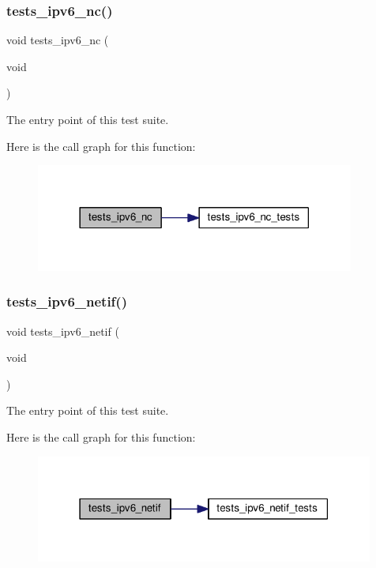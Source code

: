 \subsubsection{\texorpdfstring{tests\+\_\+ipv6\+\_\+nc()}{tests\_ipv6\_nc()}}
{\footnotesize\ttfamily void tests\+\_\+ipv6\+\_\+nc (\begin{DoxyParamCaption}\item[{void}]{ }\end{DoxyParamCaption})}



The entry point of this test suite. 

Here is the call graph for this function\+:
\nopagebreak
\begin{figure}[H]
\begin{center}
\leavevmode
\includegraphics[width=297pt]{group__unittests_ga011adecd50fb31c2e9fb4b402259fab3_cgraph}
\end{center}
\end{figure}
\mbox{\label{group__unittests_gaee22d83f1a9d3716168640ccd429c918}} 
\subsubsection{\texorpdfstring{tests\+\_\+ipv6\+\_\+netif()}{tests\_ipv6\_netif()}}
{\footnotesize\ttfamily void tests\+\_\+ipv6\+\_\+netif (\begin{DoxyParamCaption}\item[{void}]{ }\end{DoxyParamCaption})}



The entry point of this test suite. 

Here is the call graph for this function\+:
\nopagebreak
\begin{figure}[H]
\begin{center}
\leavevmode
\includegraphics[width=315pt]{group__unittests_gaee22d83f1a9d3716168640ccd429c918_cgraph}
\end{center}
\end{figure}
\mbox{\label{group__unittests_gad7854ffe9d06ab8bcefaf3b778460f2a}} 
